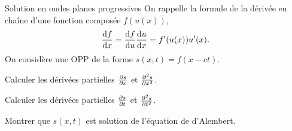 \documentclass[12pt,fancy]{cours}
\begin{document}
\begin{exemple}{Solution en ondes planes progressives}
  On rappelle la formule de la dérivée en chaîne d’une fonction composée $f(u(x))$,
  $$
    \frac{\mathrm{d} f}{\mathrm{d} x} = \frac{\mathrm{d} f}{\mathrm{d} u}\frac{\mathrm{d} u}{\mathrm{d} x} = f'(u(x))u'(x).  
  $$
  On considère une OPP de la forme $s(x,t) = f(x-ct)$.
  \begin{quest}
    \item	 Calculer les dérivées partielles $\frac{\partial{s}}{\partial{x}}$ et $\frac{\partial^2{s}}{\partial{x}^2}$.
    \item Calculer les dérivées partielles $\frac{\partial{s}}{\partial{t}}$ et $\frac{\partial^2{s}}{\partial{t}^2}$.
    \item Montrer que $s(x,t)$ est solution de l’équation de d’Alembert.
  \end{quest}

\end{exemple}
\end{document}
